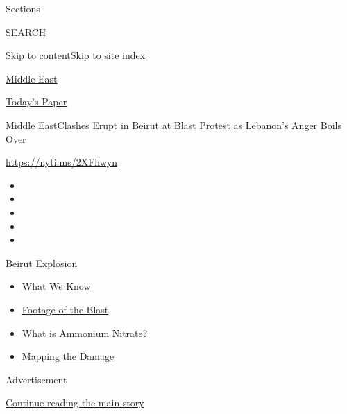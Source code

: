 Sections

SEARCH

\protect\hyperlink{site-content}{Skip to
content}\protect\hyperlink{site-index}{Skip to site index}

\href{https://www.nytimes.com/section/world/middleeast}{Middle East}

\href{https://myaccount.nytimes.com/auth/login?response_type=cookie\&client_id=vi}{}

\href{https://www.nytimes.com/section/todayspaper}{Today's Paper}

\href{/section/world/middleeast}{Middle East}\textbar{}Clashes Erupt in
Beirut at Blast Protest as Lebanon's Anger Boils Over

\href{https://nyti.ms/2XFhwyn}{https://nyti.ms/2XFhwyn}

\begin{itemize}
\item
\item
\item
\item
\item
\end{itemize}

Beirut Explosion

\begin{itemize}
\tightlist
\item
  \href{https://www.nytimes.com/2020/08/05/world/middleeast/beirut-explosion-what-happened.html?action=click\&pgtype=Article\&state=default\&region=TOP_BANNER\&context=storylines_menu}{What
  We Know}
\item
  \href{https://www.nytimes.com/2020/08/05/video/beirut-explosion-footage.html?action=click\&pgtype=Article\&state=default\&region=TOP_BANNER\&context=storylines_menu}{Footage
  of the Blast}
\item
  \href{https://www.nytimes.com/2020/08/05/world/middleeast/beirut-explosion-ammonium-nitrate.html?action=click\&pgtype=Article\&state=default\&region=TOP_BANNER\&context=storylines_menu}{What
  is Ammonium Nitrate?}
\item
  \href{https://www.nytimes.com/interactive/2020/08/04/world/middleeast/beirut-explosion-damage.html?action=click\&pgtype=Article\&state=default\&region=TOP_BANNER\&context=storylines_menu}{Mapping
  the Damage}
\end{itemize}

Advertisement

\protect\hyperlink{after-top}{Continue reading the main story}


